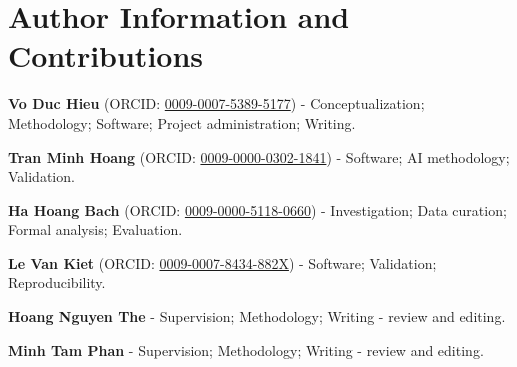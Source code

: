 \ifarchsyncanonymous\else
\noindent\begin{minipage}{\columnwidth}
\section*{Author Information and Contributions}

\noindent\textbf{Vo Duc Hieu} (ORCID: \href{https://orcid.org/0009-0007-5389-5177}{0009-0007-5389-5177}) - Conceptualization; Methodology; Software; Project administration; Writing.

\noindent\textbf{Tran Minh Hoang} (ORCID: \href{https://orcid.org/0009-0000-0302-1841}{0009-0000-0302-1841}) - Software; AI methodology; Validation.

\noindent\textbf{Ha Hoang Bach} (ORCID: \href{https://orcid.org/0009-0000-5118-0660}{0009-0000-5118-0660}) - Investigation; Data curation; Formal analysis; Evaluation.

\noindent\textbf{Le Van Kiet} (ORCID: \href{https://orcid.org/0009-0007-8434-882X}{0009-0007-8434-882X}) - Software; Validation; Reproducibility.

\noindent\textbf{Hoang Nguyen The} - Supervision; Methodology; Writing - review and editing.

\noindent\textbf{Minh Tam Phan} - Supervision; Methodology; Writing - review and editing.
\end{minipage}
\fi

\newpage
